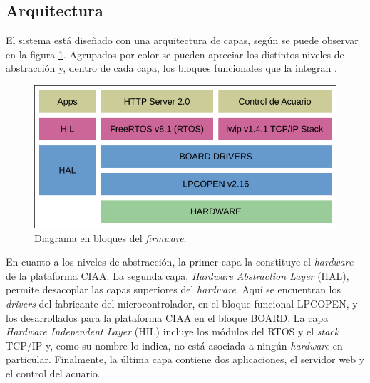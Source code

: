 \subsection{Arquitectura}
El sistema está diseñado con una arquitectura de capas, según se puede observar en la figura \ref{fig:bloques}.  Agrupados por color se pueden apreciar los distintos niveles de abstracción y, dentro de cada capa, los bloques funcionales que la integran .  %

\begin{figure}[htb!]
	\centering
    \includegraphics[width=\textwidth]{./Figures/bloques.pdf}
	\caption{Diagrama en bloques del \textit{firmware}.}
	\label{fig:bloques}
\end{figure}
	
En cuanto a los niveles de abstracción, la primer capa la constituye el \mbox{\textit{hardware}} de la plataforma CIAA. La segunda capa, \textit{Hardware Abstraction Layer} (HAL), permite desacoplar las capas superiores del \textit{hardware}. Aquí se encuentran los \textit{drivers} del fabricante del microcontrolador, en el bloque funcional LPCOPEN, y los desarrollados para la plataforma CIAA en el bloque BOARD. La capa \textit{Hardware \mbox{Independent} Layer} (HIL) incluye los módulos del RTOS y el \textit{stack} TCP/IP y, como su nombre lo indica, no está asociada a ningún \textit{hardware} en particular.  Finalmente, la última capa contiene dos aplicaciones, el servidor web y el control del acuario.




